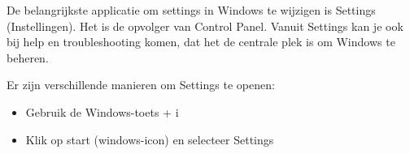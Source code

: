 De belangrijkste applicatie om settings in Windows te wijzigen is Settings (Instellingen). Het is de opvolger van Control Panel. Vanuit Settings kan je ook bij help en troubleshooting komen, dat het de centrale plek is om Windows te beheren.

Er zijn verschillende manieren om Settings te openen:
\begin{itemize}
\item Gebruik de Windows-toets + i
\item Klik op start (windows-icon) en selecteer Settings
\end{itemize}

\begin{minipage}[t]{\linewidth}
\raggedright
{}
\end{minipage}

